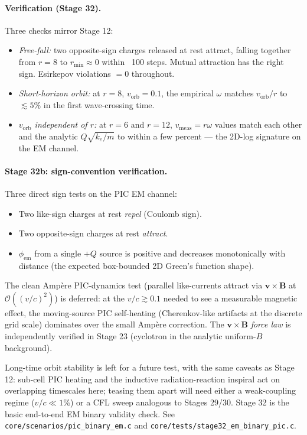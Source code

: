 \documentclass[11pt,a4paper]{article}
\newcommand{\vv}[1]{\mathbf{#1}}
\newcommand{\order}[1]{\mathcal{O}(#1)}
\begin{document}
\paragraph{Verification (Stage 32).}  Three checks mirror Stage 12:

\begin{itemize}
  \item \emph{Free-fall:} two opposite-sign charges released at rest
        attract, falling together from $r = 8$ to $r_{\min} \approx 0$
        within ~100 steps.  Mutual attraction has the right sign.
        Esirkepov violations $= 0$ throughout.
  \item \emph{Short-horizon orbit:} at $r = 8$, $v_{\mathrm{orb}} = 0.1$,
        the empirical $\omega$ matches $v_{\mathrm{orb}}/r$ to $\lesssim 5\%$
        in the first wave-crossing time.
  \item \emph{$v_{\mathrm{orb}}$ independent of $r$:} at $r = 6$ and
        $r = 12$, $v_{\mathrm{meas}} = r \omega$ values match each
        other and the analytic $Q\sqrt{k_e/m}$ to within a few percent
        --- the 2D-log signature on the EM channel.
\end{itemize}

\paragraph{Stage 32b: sign-convention verification.}  Three direct
sign tests on the PIC EM channel:
\begin{itemize}
  \item Two like-sign charges at rest \emph{repel} (Coulomb sign).
  \item Two opposite-sign charges at rest \emph{attract}.
  \item $\phi_{\mathrm{em}}$ from a single $+Q$ source is positive and
        decreases monotonically with distance (the expected
        box-bounded 2D Green's function shape).
\end{itemize}
The clean Amp\`ere PIC-dynamics test (parallel like-currents attract
via $\vv{v}\times\vv{B}$ at $\order{(v/c)^2}$) is deferred: at the
$v/c \gtrsim 0.1$ needed to see a measurable magnetic effect, the
moving-source PIC self-heating (Cherenkov-like artifacts at the
discrete grid scale) dominates over the small Amp\`ere correction.
The $\vv{v}\times\vv{B}$ \emph{force law} is independently verified
in Stage 23 (cyclotron in the analytic uniform-$B$ background).

Long-time orbit stability is left for a future test, with the same
caveats as Stage 12: sub-cell PIC heating and the inductive
radiation-reaction inspiral act on overlapping timescales here; teasing
them apart will need either a weak-coupling regime ($v/c \ll 1\%$) or
a CFL sweep analogous to Stages 29/30.  Stage 32 is the basic
end-to-end EM binary validity check.  See
\texttt{core/scenarios/pic\_binary\_em.c} and
\texttt{core/tests/stage32\_em\_binary\_pic.c}.
\end{document}
